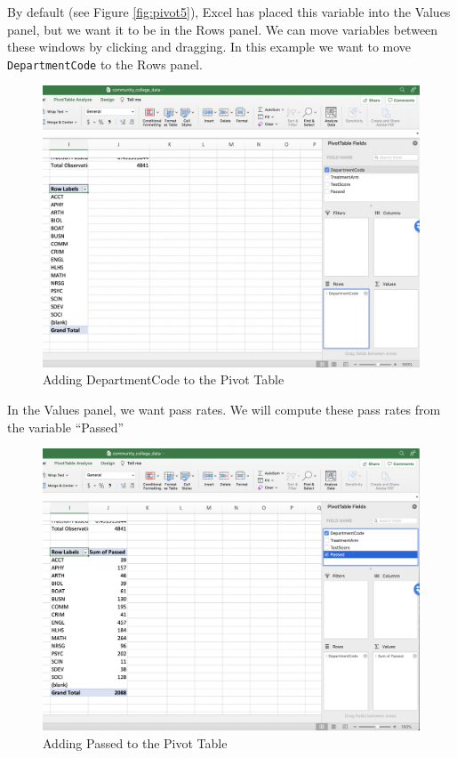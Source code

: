 \documentclass[
]{book}
\begin{document}
By default (see Figure \ref{fig:pivot5}), Excel has placed this variable into the Values panel, but we want it to be in the Rows panel. We can move variables between these windows by clicking and dragging. In this example we want to move \texttt{DepartmentCode} to the Rows panel.

\begin{figure}

{\centering \includegraphics[width=1\linewidth]{images/01_pivot6} 

}

\caption{Adding DepartmentCode to the Pivot Table}\label{fig:pivot6}
\end{figure}

In the Values panel, we want pass rates. We will compute these pass rates from the variable ``Passed''

\begin{figure}

{\centering \includegraphics[width=1\linewidth]{images/01_pivot7} 

}

\caption{Adding Passed to the Pivot Table}\label{fig:pivot7}
\end{figure}
\end{document}
